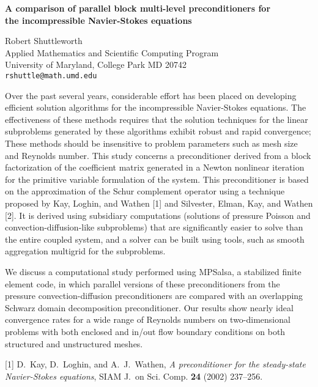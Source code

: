 \documentclass[twosided]{report}
\begin{document}
\begin{center}
{\large			%
{\bf A comparison of parallel block multi-level preconditioners for \\
	the incompressible Navier-Stokes equations}}

	Robert Shuttleworth \\
	Applied Mathematics and Scientific Computing Program \\
	University of Maryland, College Park MD 20742 \\
	{\tt rshuttle@math.umd.edu}
\end{center}
Over the past several years, considerable effort has been
placed on developing efficient solution algorithms for the
incompressible Navier-Stokes equations. The effectiveness of
these methods requires that the solution techniques for the
linear subproblems generated by these algorithms exhibit
robust and rapid convergence; These methods should be
insensitive to problem parameters such as mesh size and
Reynolds number. This study concerns a preconditioner
derived from a block factorization of the coefficient matrix
generated in a Newton nonlinear iteration for the primitive
variable formulation of the system. This preconditioner is
based on the approximation of the Schur complement operator
using a technique proposed by Kay, Loghin, and Wathen [1]
and Silvester, Elman, Kay, and Wathen [2]. It is derived
using subsidiary computations (solutions of pressure Poisson
and convection-diffusion-like subproblems) that are
significantly easier to solve than the entire coupled
system, and a solver can be built using tools, such as
smooth aggregation multigrid for the subproblems.

We discuss
a computational study performed using MPSalsa, a stabilized
finite element code, in which parallel versions of these
preconditioners from the pressure convection-diffusion
preconditioners are compared with an overlapping Schwarz
domain decomposition preconditioner.  Our results show
nearly ideal convergence rates for a wide range of Reynolds
numbers on two-dimensional problems with both enclosed and
in/out flow boundary conditions on both structured and
unstructured meshes.

[1] D.~Kay, D.~Loghin, and A.~J.~Wathen,
{\em A preconditioner for the steady-state
Navier-Stokes equations},
SIAM J.~on Sci. Comp. {\bf 24} (2002) 237--256.
\end{document}
